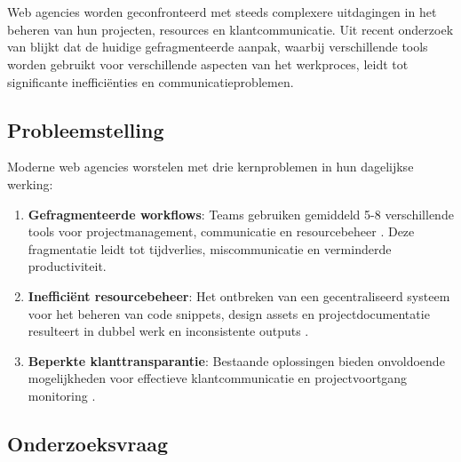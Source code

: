 
\chapter{}
\label{ch:inleiding}

Web agencies worden geconfronteerd met steeds complexere uitdagingen in het beheren van hun projecten, resources en klantcommunicatie. Uit recent onderzoek van \textcite{Reid2014} blijkt dat de huidige gefragmenteerde aanpak, waarbij verschillende tools worden gebruikt voor verschillende aspecten van het werkproces, leidt tot significante inefficiënties en communicatieproblemen.

\section{Probleemstelling}
\label{sec:probleemstelling}

Moderne web agencies worstelen met drie kernproblemen in hun dagelijkse werking:

\begin{enumerate}
    \item \textbf{Gefragmenteerde workflows}: Teams gebruiken gemiddeld 5-8 verschillende tools voor projectmanagement, communicatie en resourcebeheer \autocite{Alexander2019}. Deze fragmentatie leidt tot tijdverlies, miscommunicatie en verminderde productiviteit.
    
    \item \textbf{Inefficiënt resourcebeheer}: Het ontbreken van een gecentraliseerd systeem voor het beheren van code snippets, design assets en projectdocumentatie resulteert in dubbel werk en inconsistente outputs \autocite{Wilson2023}.
    
    \item \textbf{Beperkte klanttransparantie}: Bestaande oplossingen bieden onvoldoende mogelijkheden voor effectieve klantcommunicatie en projectvoortgang monitoring \autocite{Zhang2024}.
\end{enumerate}

\section{Onderzoeksvraag}
\label{sec:onderzoeksvraag}

